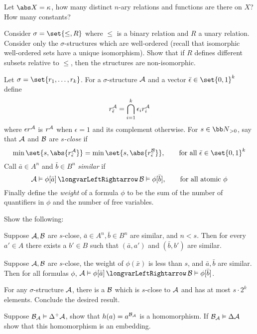     \benum
        \item Let $\abs X=\kappa$, how many distinct $n$-ary relations and functions are there on $X$?
        How many constants?
        \item Consider $\sigma=\set{\leq,R}$ where $\leq$ is a binary relation and $R$ a unary relation.
        Consider only the $\sigma$-structures which are well-ordered (recall that isomorphic well-ordered sets have a unique isomorphism).
        Show that if $R$ defines different subsets relative to $\leq$, then the structures are non-isomorphic.
        \item Let $\sigma=\set{r_1,\dots,r_k}$.
        For a $\sigma$-structure ${\cal A}$ and a vector $\bar\epsilon\in\set{0,1}^k$ define
        $$ r_{\bar\epsilon}^{{\cal A}} = \bigcap_{i=1}^k\epsilon_ir_i^{{\cal A}} $$
        where $\epsilon r^{{\cal A}}$ is $r^{{\cal A}}$ when $\epsilon=1$ and its complement otherwise.
        For $s\in{\bb N}_{>0}$, say that ${\cal A}$ and ${\cal B}$ are {\it $s$-close} if
        $$ \min\set{s,\abs{r^{\c A}_{\bar\epsilon}}} = \min\set{s,\abs{r^{\c B}_{\bar\epsilon}}},\qquad \hbox{for all $\bar\epsilon\in\set{0,1}^k$} $$
        Call $\bar a\in A^n$ and $\bar b\in B^n$ {\it similar} if
        $$ \c A\vDash\phi[\bar a] \iff \c B\vDash\phi[\bar b],\qquad \hbox{for all atomic $\phi$} $$
        Finally define the {\it weight} of a formula $\phi$ to be the sum of the number of quantifiers in $\phi$ and the number of free variables.

        Show the following:
        \benum
            \item Suppose ${\cal A},{\cal B}$ are $s$-close, $\bar a\in A^n,\bar b\in B^n$ are similar, and $n<s$.
            Then for every $a'\in A$ there exists a $b'\in B$ such that $(\bar a,a')$ and $(\bar b,b')$ are similar.
            \item Suppose ${\cal A},{\cal B}$ are $s$-close, the weight of $\phi(\bar x)$ is less than $s$, and $\bar a,\bar b$ are similar.
            Then for all formulas $\phi$, $\c A\vDash\phi[\bar a]\iff\c B\vDash\phi[\bar b]$.
            \item For any $\sigma$-structure ${\cal A}$, there is a ${\cal B}$ which is $s$-close to ${\cal A}$ and has at most $s\cdot2^k$ elements.
            Conclude the desired result.
        \eenum
    \eenum

\ehint

\bhint

    Suppose ${\cal B}_{{\cal A}}\vDash\Delta^+{\cal A}$, show that $h(a)=a^{{\cal B}_{{\cal A}}}$ is a homomorphism.
    If ${\cal B}_{{\cal A}}\vDash\Delta{\cal A}$ show that this homomorphism is an embedding.

\ehint

\bye

